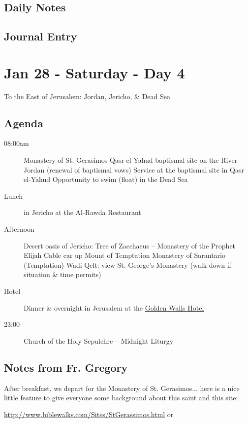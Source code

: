 \documentclass[letterpaper]{report}
\begin{document}
\clearpage
\subsection{Daily Notes}

\clearpage
\subsection{Journal Entry}

\clearpage
\section{Jan 28 - Saturday - Day 4}
To the East of Jerusalem: Jordan, Jericho, \& Dead Sea

\subsection{Agenda}
\begin{description}
	\item[08:00am]  Monastery of St. Gerasimos
	  \subitem Qasr el-Yahud baptismal site on the River Jordan
	    (renewal of baptismal vows)
	  \subitem Service at the baptismal site in Qasr el-Yahud
	  \subitem Opportunity to swim (float) in the Dead Sea
	\item[Lunch] in Jericho at the Al-Rawda Restaurant 
	\item[Afternoon] Desert oasis of Jericho: Tree of Zacchaeus – Monastery of the Prophet Elijah
	  \subitem Cable car up Mount of Temptation
	  \subitem Monastery of Sarantario (Temptation)
	  \subitem Wadi Qelt: view St. George's Monastery (walk down if situation \& time permits) 
	\item[Hotel] Dinner \& overnight in Jerusalem at the
	  \href{http://goldenwalls.com/}{Golden Walls Hotel}
	\item[23:00]  Church of the Holy Sepulchre – Midnight Liturgy
\end{description}

\subsection{Notes from Fr. Gregory}
After breakfast, we depart for the Monastery of St. Gerasimos...
here is a nice little feature to give everyone some background about this
saint and this site:

\url{http://www.biblewalks.com/Sites/StGerassimos.html}
or
\end{document}
